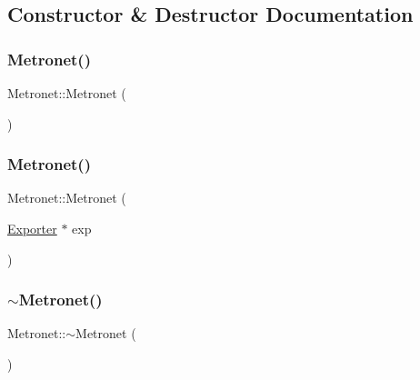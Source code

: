 \subsection{Constructor \& Destructor Documentation}
\mbox{\label{class_metronet_abdd205c39857ed1aabd104a6886cad45}} 
\subsubsection{\texorpdfstring{Metronet()}{Metronet()}\hspace{0.1cm}{\footnotesize\ttfamily [1/2]}}
{\footnotesize\ttfamily Metronet\+::\+Metronet (\begin{DoxyParamCaption}{ }\end{DoxyParamCaption})}

\mbox{\label{class_metronet_a2f8f40f437a1ae14ea78d306aaed6bd4}} 
\subsubsection{\texorpdfstring{Metronet()}{Metronet()}\hspace{0.1cm}{\footnotesize\ttfamily [2/2]}}
{\footnotesize\ttfamily Metronet\+::\+Metronet (\begin{DoxyParamCaption}\item[{\hyperlink{class_exporter}{Exporter} $\ast$}]{exp }\end{DoxyParamCaption})}

\mbox{\label{class_metronet_afa96be4bf66f8d7dcf3f40a7487d2ea7}} 
\subsubsection{\texorpdfstring{$\sim$\+Metronet()}{~Metronet()}}
{\footnotesize\ttfamily Metronet\+::$\sim$\+Metronet (\begin{DoxyParamCaption}{ }\end{DoxyParamCaption})\hspace{0.3cm}{\ttfamily [virtual]}}



